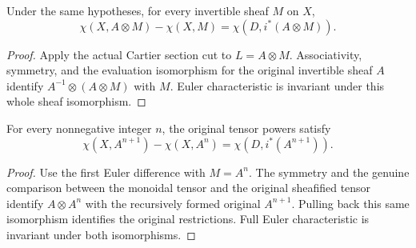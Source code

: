 \begin{lemma}
\label{lem:seshadri-section-first-difference}
\leanok
{}
Under the same hypotheses, for every invertible sheaf $M$ on $X$,
\[
 \chi(X,A\otimes M)-\chi(X,M)=\chi(D,i^*(A\otimes M)).
\]
\end{lemma}
\begin{proof}
Apply the actual Cartier section cut to $L=A\otimes M$.
Associativity, symmetry, and the evaluation isomorphism for the original
invertible sheaf $A$ identify $A^{-1}\otimes(A\otimes M)$ with $M$.
Euler characteristic is invariant under this whole sheaf isomorphism.
\end{proof}

\begin{lemma}
\label{lem:seshadri-tensor-power-first-difference}
\leanok
{}
For every nonnegative integer $n$, the original tensor powers satisfy
\[
 \chi(X,A^{n+1})-\chi(X,A^n)=\chi(D,i^*(A^{n+1})).
\]
\end{lemma}
\begin{proof}
Use the first Euler difference with $M=A^n$. The symmetry and the genuine
comparison between the monoidal tensor and the original sheafified tensor
identify $A\otimes A^n$ with the recursively formed original $A^{n+1}$.
Pulling back this same isomorphism identifies the original restrictions.
Full Euler characteristic is invariant under both isomorphisms.
\end{proof}

